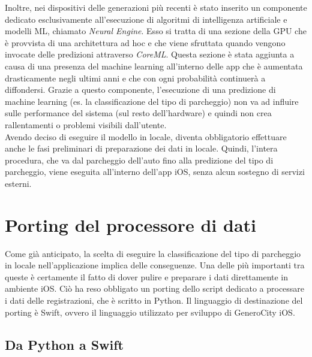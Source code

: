 Inoltre, nei dispositivi delle generazioni più recenti è stato inserito
un componente dedicato esclusivamente all'esecuzione di algoritmi di
intelligenza artificiale e modelli ML, chiamato \emph{Neural Engine}.
Esso si tratta di una sezione della GPU che è provvista di una 
architettura ad hoc e che viene sfruttata quando vengono invocate delle
predizioni attraverso \emph{CoreML}. Questa sezione è stata aggiunta 
a causa di una presenza del machine learning all'interno delle app
che è aumentata drasticamente negli ultimi anni e che con ogni
probabilità continuerà a diffondersi. Grazie a questo componente,
l'esecuzione di una predizione di machine learning (es. la 
classificazione del tipo di parcheggio) non va ad influire sulle
performance del sistema (sul resto dell'hardware) e quindi non 
crea rallentamenti o problemi visibili dall'utente.\\
Avendo deciso di eseguire il modello in locale, diventa obbligatorio
effettuare anche le fasi preliminari di preparazione dei dati in 
locale. Quindi, l'intera procedura, che va dal parcheggio 
dell'auto fino alla predizione del tipo di parcheggio, viene
eseguita all'interno dell'app iOS, senza alcun sostegno di 
servizi esterni.

\section{Porting del processore di dati}

Come già anticipato, la scelta di eseguire la classificazione del tipo di
parcheggio in locale nell'applicazione implica delle conseguenze.
Una delle più importanti tra queste è certamente il fatto di dover
pulire e preparare i dati direttamente in ambiente iOS. Ciò
ha reso obbligato un porting dello script dedicato a processare i
dati delle registrazioni, che è scritto in Python. Il linguaggio di 
destinazione del porting è Swift, ovvero il linguaggio utilizzato
per sviluppo di GeneroCity iOS.

\subsection{Da Python a Swift}

